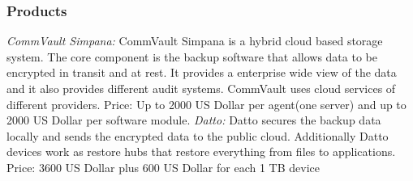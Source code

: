 \documentclass[12pt]{article}
\begin{document}
\subsubsection{Products}
\emph{CommVault Simpana:}
\newline
CommVault Simpana is a hybrid cloud based storage system.  The core component is the backup software that allows data to be encrypted in transit and at rest. It provides a enterprise wide view of the data and it also provides different audit systems.  CommVault uses cloud services of different providers.
\newline
\newline
Price:  Up to 2000 US Dollar per agent(one server) and up to 2000 US Dollar per software module.
\newline
\newline
\emph{Datto:}
\newline
Datto secures the backup data locally and sends the encrypted data to the public cloud. Additionally Datto devices work as restore hubs that restore everything from files to applications.
\newline
\newline
Price: 3600 US Dollar plus 600 US Dollar for each 1 TB device   


\end{document}
